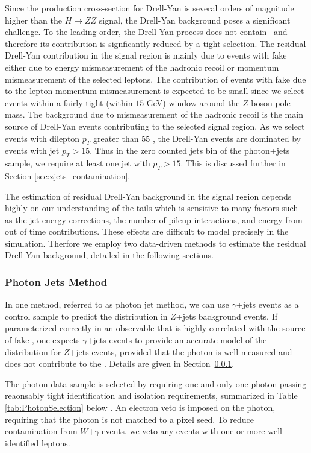 
Since the production cross-section for Drell-Yan is several orders of magnitude 
higher than the $H \to ZZ$ signal, the Drell-Yan background poses a significant 
challenge. To the leading order, the Drell-Yan process does not contain \met\,  
and therefore its contribution is signficantly reduced by a tight \met selection. 
The residual Drell-Yan contribution in the signal region 
is mainly due to events with fake \met either due to energy mismeasurement of  
the hadronic recoil or momentum mismeasurement of the selected leptons. 
The contribution of events with fake \met due to the lepton momentum mismeasurement 
is expected to be small since we select events within a fairly tight (within $15$ GeV) window 
around the $Z$ boson pole mass. The background due to mismeasurement of the hadronic
recoil is the main source of Drell-Yan events contributing to the selected signal region. 
As we select events with dilepton $p_T$ greater than 55 \GeV, the Drell-Yan events 
are dominated by events with jet $p_T>15$\GeV.
Thus in the zero counted jets bin of the photon+jets sample, 
we require at least one jet with $p_T>15$\GeV.
This is discussed further in Section \ref{sec:zjets_contamination}.

The estimation of residual Drell-Yan background in the signal region depends highly on
our understanding of the \met tails which is sensitive to many factors such as 
the jet energy corrections, the number of pileup interactions, and energy from out of time
contributions. These effects are difficult to model precisely in the simulation.
Therfore we employ two data-driven methods to estimate the residual Drell-Yan background, 
detailed in the following sections. 

\subsubsection{Photon Jets Method}
\label{sec:photonjets}

In one method, referred to as photon jet method, we can use
$\gamma$+jets events as a control sample to predict the \met distribution in $Z$+jets
background events. 
If parameterized correctly in an observable that is highly correlated 
with the source of fake \met, one expects $\gamma$+jets events to provide an accurate
model of the \met distribution for $Z$+jets events, provided that the photon
is well measured and does not contribute to the \met. Details are given in Section~\ref{sec:photonjets}. 

The photon data sample is selected by requiring one and only one photon passing reaonsably tight
identification and isolation requirements, summarized in Table \ref{tab:PhotonSelection} below 
\cite{MITHggNote}. 
An electron veto is imposed on the photon, requiring that the photon is not matched to a pixel seed.
To reduce contamination from $W$+$\gamma$ events, we veto any events with one or 
more well identified leptons.

